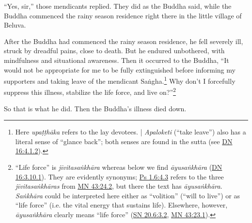 \documentclass[12pt,openany]{book}%
\begin{document}
“Yes, sir,” those mendicants replied. They did as the Buddha said, while the Buddha commenced the rainy season residence right there in the little village of Beluva. 

After the Buddha had commenced the rainy season residence, he fell severely ill, struck by dreadful pains, close to death. But he endured unbothered, with mindfulness and situational awareness. Then it occurred to the Buddha, “It would not be appropriate for me to be fully extinguished before informing my supporters and taking leave of the mendicant \textsanskrit{Saṅgha}.\footnote{Here \textit{\textsanskrit{upaṭṭhāka}} refers to the lay devotees. | \textit{Apaloketi} (“take leave”) also has a literal sense of “glance back”; both senses are found in the sutta (see \href{https://suttacentral.net/dn16/en/sujato\#4.1.2}{DN 16:4.1.2}). } Why don’t I forcefully suppress this illness, stabilize the life force, and live on?”\footnote{“Life force” is \textit{\textsanskrit{jīvitasaṅkhāra}} whereas below we find \textit{\textsanskrit{āyusaṅkhāra}} (\href{https://suttacentral.net/dn16/en/sujato\#3.10.1}{DN 16:3.10.1}). They are evidently synonyms; \href{https://suttacentral.net/ps1.6/en/sujato\#4.3}{Ps 1.6:4.3} refers to the three \textit{\textsanskrit{jīvitasaṅkhāras}} from \href{https://suttacentral.net/mn43/en/sujato\#24.2}{MN 43:24.2}, but there the text has \textit{\textsanskrit{āyusaṅkhāra}}. \textit{\textsanskrit{Saṅkhāra}} could be interpreted here either as “volition” (“will to live”) or as “life force” (i.e. the vital energy that sustains life). Elsewhere, however, \textit{\textsanskrit{āyusaṅkhāra}} clearly means “life force” (\href{https://suttacentral.net/sn20.6/en/sujato\#3.2}{SN 20.6:3.2}, \href{https://suttacentral.net/mn43/en/sujato\#23.1}{MN 43:23.1}). } 

So that is what he did. Then the Buddha’s illness died down. 
\end{document}
